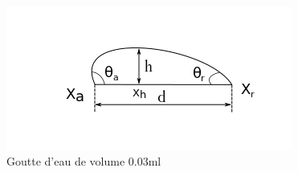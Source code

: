 \documentclass[french]{article}
\begin{document}
\begin{figure}[ht]
	\centering
	\includegraphics[scale = 0.6]{./image/rrgou.png}
	\caption{Goutte d'eau de volume $0.03$ml}
\end{figure}
\end{document}
